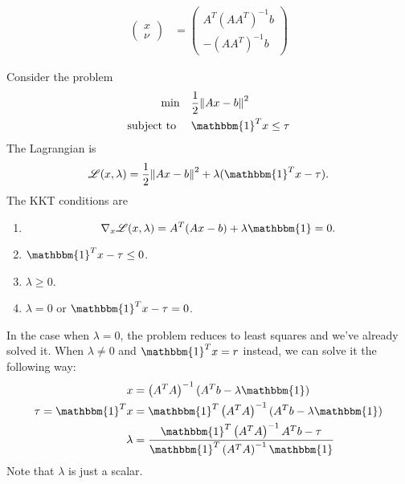 \documentclass[class=article,crop=false]{standalone}
\begin{document}
\begin{eg}
\begin{align*}
	\begin{pmatrix} x \\ \nu \end{pmatrix} &= \begin{pmatrix} A^{T}\left(A A^{T} \right) ^{-1} b \\-\left( AA^{T} \right)^{-1} b \end{pmatrix}  
\end{align*}
\end{eg}
\begin{eg}
Consider the problem
\begin{align*}
\min\quad &\frac{1}{2} \norm{ Ax-b}^2  \\
\text{subject to } \quad & \mathbbm{1}^{T} x \leq \tau 
\end{align*}
The Lagrangian is
\[
	\mathscr{L}(x,\lambda) = \frac{1}{2}\norm{ Ax-b}^2 + \lambda (\mathbbm{1}^{T}x - \tau) 
.\]
The KKT conditions are
\begin{enumerate}[label=(\arabic*)]
	\item 
		\[
			\nabla _x \mathscr{L}(x,\lambda) = A^{T}(Ax-b) + \lambda \mathbbm{1} = 0
		.\] 
	\item $ \mathbbm{1}^{T}x - \tau \leq 0$.
	\item $ \lambda\geq 0$.
	\item $ \lambda = 0$ or $ \mathbbm{1}^{T} x -\tau = 0$.
\end{enumerate}
In the case when $ \lambda=0$, the problem reduces to least squares and we've already solved it. When $ \lambda \neq 0$ and $ \mathbbm{1}^{T}x  = r$ instead, we can solve it the following way:
\begin{align*}
	x &= \left( A^{T}A \right) ^{-1} (A^{T}b - \lambda\mathbbm{1}) \\
	\tau=\mathbbm{1}^{T}x &= \mathbbm{1}^{T} \left( A^{T}A \right) ^{-1} (A^{T}b- \lambda \mathbbm{1})\\
	\lambda &= \frac{\mathbbm{1}^{T} \left( A^{T}A \right)^{-1} A^{T}b - \tau }{ \mathbbm{1}^{T} \left( A^{T}A \right)^{-1} \mathbbm{1} } 
\end{align*}
Note that $ \lambda$ is just a scalar.
\end{eg}
\end{document}
